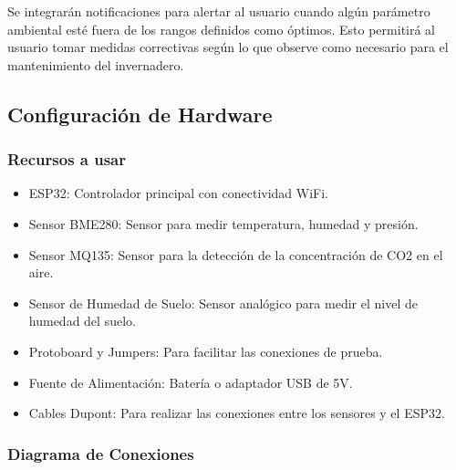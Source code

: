 \documentclass[../main]{subfiles}
\begin{document}
Se integrarán notificaciones para alertar al usuario cuando algún parámetro
ambiental esté fuera de los rangos definidos como óptimos.
Esto permitirá al usuario tomar medidas correctivas según lo que observe como
necesario para el mantenimiento del invernadero.

\subsection{Configuración de Hardware}

\subsubsection{Recursos a usar}

\begin{itemize}
	\item ESP32: Controlador principal con conectividad WiFi.
	\item Sensor BME280: Sensor para medir temperatura, humedad y presión.
	\item Sensor MQ135: Sensor para la detección de la concentración de CO2 en el aire.
	\item Sensor de Humedad de Suelo: Sensor analógico para medir el nivel de humedad del suelo.
	\item Protoboard y Jumpers: Para facilitar las conexiones de prueba.
	\item Fuente de Alimentación: Batería o adaptador USB de 5V.
	\item Cables Dupont: Para realizar las conexiones entre los sensores y el ESP32.
\end{itemize}

\subsubsection{ Diagrama de Conexiones}
\end{document}
